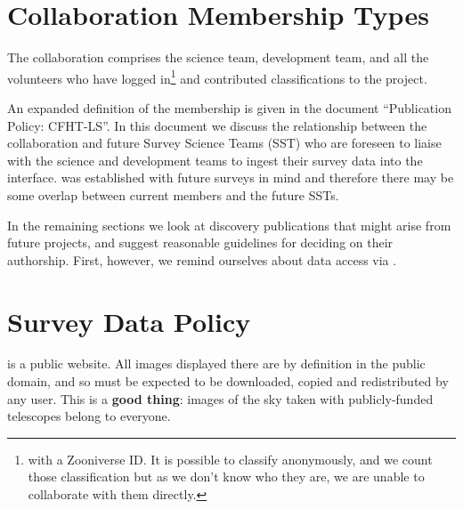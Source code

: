 \documentclass[a4paper]{article}
\begin{document}


\section{Collaboration Membership Types}
\label{sec:members}

The \sw collaboration comprises the \sw science team, \sw development team, and all the volunteers who have 
logged in\footnote{with a Zooniverse ID. It is possible to classify anonymously, and we count those classification but as we don't know who they are, we are unable to collaborate with them directly.} and contributed classifications to the project. 

An expanded definition of the \sw membership is given in the document ``\sw Publication Policy: CFHT-LS''.  In this document we discuss the relationship between the \sw collaboration and future Survey Science Teams (SST) who are foreseen to liaise with the \sw science and development teams to ingest their survey data into the \sw interface. \sw was established with future surveys in mind and therefore there may be some overlap between current \sw members and the future SSTs.


In the remaining sections we look at discovery publications that might
arise from future \sw projects, and suggest reasonable guidelines for
deciding on their authorship. First, however, we remind ourselves about data
access via \sw.



\section{Survey Data Policy}
\label{sec:data}

\sw is a public website. All images displayed there are by definition in the
public domain, and so must be expected to be downloaded, copied and
redistributed by any \sw user. This is a \textbf{good thing}: images of the sky taken
with publicly-funded telescopes belong to everyone. 
\end{document}
